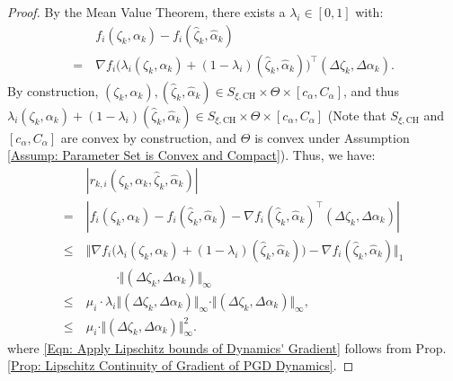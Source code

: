 \documentclass[10pt,a4paper]{amsart}
\newcommand{\dynamicsFullState}{f}
\newcommand{\hessianBound}{\mu}
\newcommand{\linearizationError}{r}
\newcommand{\paramSet}{\Theta}
\newcommand{\ratePGD}{\alpha}
\newcommand{\ratePGDError}{\Delta\ratePGD}
\newcommand{\ratePGDMax}{C_\ratePGD}
\newcommand{\ratePGDMin}{c_\ratePGD}
\newcommand{\ratePGDNominal}{\hat\ratePGD}
\newcommand{\state}{\zeta}
\newcommand{\stateError}{\Delta\state}
\newcommand{\stateNominal}{\hat\state}
\newcommand{\var}{\xi}
\newcommand{\varConvexHull}{S_{\var, \text{CH}}}
\begin{document}
\begin{proof}
 By the Mean Value Theorem, there exists a $\lambda_i \in [0, 1]$ with:
{
\setlength{\abovedisplayskip}{3.5pt}
\setlength{\belowdisplayskip}{3.5pt}
\begin{align} \nonumber
    &\dynamicsFullState_i(\state_k, \ratePGD_k) - \dynamicsFullState_i(\stateNominal_k, \ratePGDNominal_k) \\ \nonumber
    = \ &\nabla \dynamicsFullState_i\big( \lambda_i(\state_k, \ratePGD_k) + (1 - \lambda_i)(\stateNominal_k, \ratePGDNominal_k) \big)^\top (\stateError_k, \ratePGDError_k).
\end{align}
}
\hspace{-1mm}By construction, $(\state_k, \ratePGD_k), (\stateNominal_k, \ratePGDNominal_k) \in \varConvexHull \times \paramSet \times [\ratePGDMin, \ratePGDMax]$, and thus 
$\lambda_i(\state_k, \ratePGD_k) + (1 - \lambda_i)(\stateNominal_k, \ratePGDNominal_k) \in \varConvexHull \times \paramSet \times [\ratePGDMin, \ratePGDMax]$ (Note that $\varConvexHull$ and $[\ratePGDMin, \ratePGDMax]$ are convex by construction, and $\paramSet$ is convex under Assumption \ref{Assump: Parameter Set is Convex and Compact}).
Thus, we have:
{
\setlength{\abovedisplayskip}{3.5pt}
\setlength{\belowdisplayskip}{3.5pt}
\begin{align} \nonumber
    &|\linearizationError_{k,i}(\state_k, \ratePGD_k, \stateNominal_k, \ratePGDNominal_k)| \\ \nonumber
    = \ &|\dynamicsFullState_i(\state_k, \ratePGD_k) - \dynamicsFullState_i(\stateNominal_k, \ratePGDNominal_k) - \nabla \dynamicsFullState_i(\stateNominal_k, \ratePGDNominal_k)^\top (\stateError_k, \ratePGDError_k) | \\ \nonumber
    \leq \ &\Vert \nabla \dynamicsFullState_i\big( \lambda_i(\state_k, \ratePGD_k) + (1 - \lambda_i)(\stateNominal_k, \ratePGDNominal_k) \big) - \nabla \dynamicsFullState_i(\stateNominal_k, \ratePGDNominal_k) \Vert_1 \\ \nonumber
    &\hspace{1cm} \cdot \Vert (\stateError_k, \ratePGDError_k) \Vert_\infty \\ 
    \label{Eqn: Apply Lipschitz bounds of Dynamics' Gradient}
    \leq \ &\mu_i \cdot \lambda_i \Vert (\stateError_k, \ratePGDError_k) \Vert_\infty \cdot \Vert (\stateError_k, \ratePGDError_k) \Vert_\infty,
    \\ \nonumber
    \leq \ &\hessianBound_i \cdot \Vert (\stateError_k, \ratePGDError_k) \Vert_\infty^2.
\end{align}
}
where \eqref{Eqn: Apply Lipschitz bounds of Dynamics' Gradient} follows from Prop. \ref{Prop: Lipschitz Continuity of Gradient of PGD Dynamics}.
\end{proof}
\end{document}
